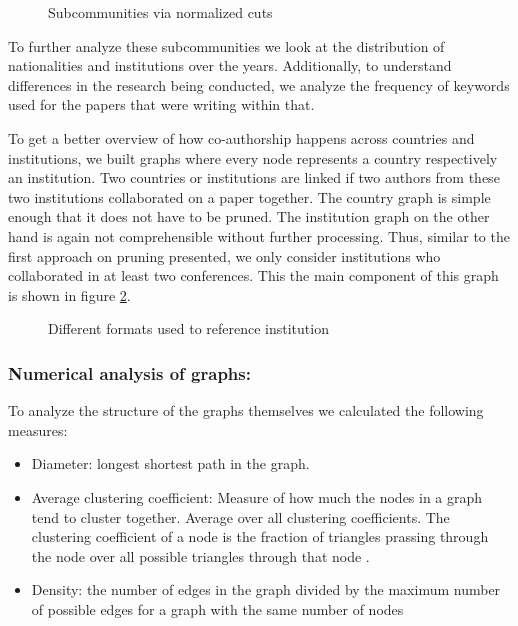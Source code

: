 \documentclass[article,twocolumn]{IEEEtran}
\providecommand{\tightlist}{%
      \setlength{\itemsep}{0pt}\setlength{\parskip}{0pt}}
\begin{document}
    \begin{figure}
        \begin{center}\end{center}
        \caption{Subcommunities via normalized cuts}
        \label{normalized}
    \end{figure}
    
    To further analyze these subcommunities we look at the distribution of
nationalities and institutions over the years. Additionally, to
understand differences in the research being conducted, we analyze the
frequency of keywords used for the papers that were writing within that.

To get a better overview of how co-authorship happens across countries
and institutions, we built graphs where every node represents a country
respectively an institution. Two countries or institutions are linked if
two authors from these two institutions collaborated on a paper
together. The country graph is simple enough that it does not have to be
pruned. The institution graph on the other hand is again not
comprehensible without further processing. Thus, similar to the first
approach on pruning presented, we only consider institutions who
collaborated in at least two conferences. This the main component of
this graph is shown in figure \ref{unigraph}.


    \begin{figure}
        \begin{center}\end{center}
        \caption{Different formats used to reference institution}
        \label{unigraph}
    \end{figure}
    
    \hypertarget{numerical-analysis-of-graphs}{%
\subsubsection{Numerical analysis of
graphs:}\label{numerical-analysis-of-graphs}}

To analyze the structure of the graphs themselves we calculated the
following measures:

\begin{itemize}
\tightlist
\item
  Diameter: longest shortest path in the graph.
\item
  Average clustering coefficient: Measure of how much the nodes in a
  graph tend to cluster together. Average over all clustering
  coefficients. The clustering coefficient of a node is the fraction of
  triangles prassing through the node over all possible triangles
  through that node \cite{watts1998collective}.
\item
  Density: the number of edges in the graph divided by the maximum
  number of possible edges for a graph with the same number of nodes
\end{itemize}
\end{document}
